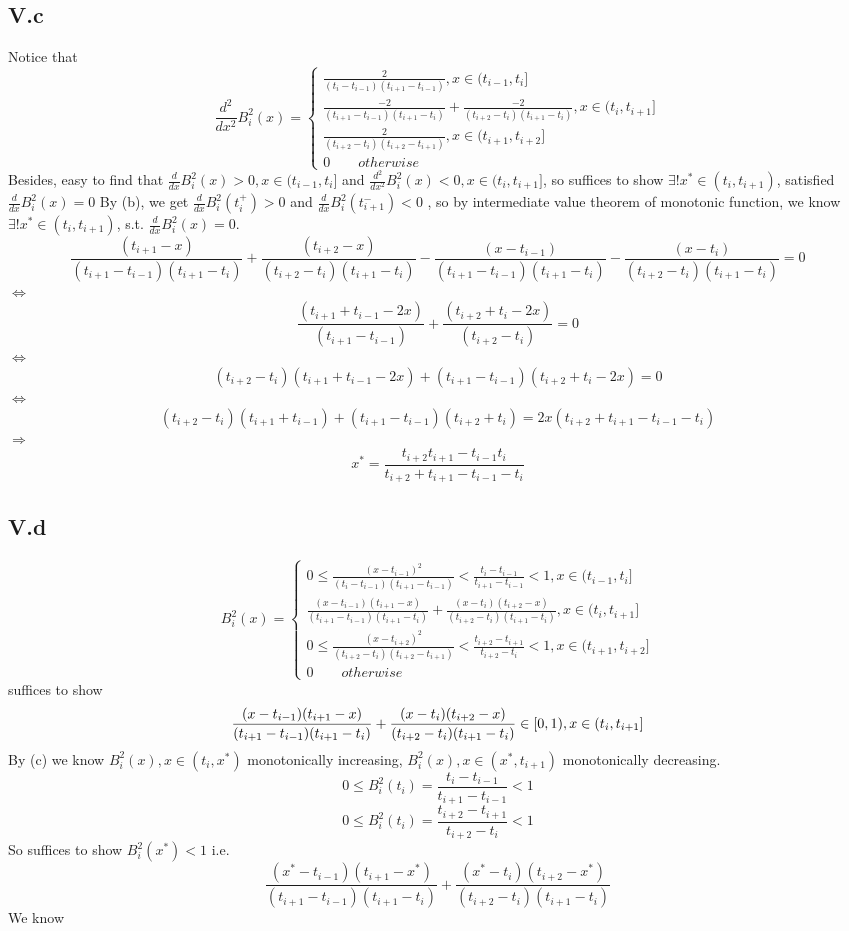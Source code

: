 \documentclass[a4paper]{article}
\begin{document}
\subsection*{V.c}
Notice that 
\[
\frac{d^2}{dx^2}B_i^2(x) = 
\begin{cases}
\frac{2}{(t_i-t_{i-1})(t_{i+1}-t_{i-1})}, x\in (t_{i-1},t_i] \\
\frac{-2}{(t_{i+1}-t_{i-1})(t_{i+1}-t_{i})}+
\frac{-2}{(t_{i+2}-t_{i})(t_{i+1}-t_{i})},x\in (t_{i},t_{i+1}] \\
\frac{2}{(t_{i+2}-t_{i})(t_{i+2}-t_{i+1})},x\in (t_{i+1},t_{i+2}] \\
0 \qquad otherwise
\end{cases}
\]
Besides, easy to find that $\frac{d}{dx}B_i^2(x) > 0, x\in (t_{i-1},t_i]$ and $\frac{d^2}{dx^2}B_i^2(x) < 0,x\in (t_{i},t_{i+1}]$, so suffices to show $\exists !x^* \in (t_{i},t_{i+1})$,
 satisfied  $\frac{d}{dx}B_i^2(x) = 0$ By (b), we get $\frac{d}{dx}B_i^2(t_i^+) > 0 $ and $\frac{d}{dx}B_i^2(t_{i+1}^-) < 0$
, so by intermediate value theorem of monotonic function, we know $\exists !x^* \in (t_{i},t_{i+1})$, s.t. 
$\frac{d}{dx}B_i^2(x) = 0$.
\[
\frac{(t_{i+1}-x)}{(t_{i+1}-t_{i-1})(t_{i+1}-t_{i})}+
\frac{(t_{i+2}-x)}{(t_{i+2}-t_{i})(t_{i+1}-t_{i})} - 
\frac{(x-t_{i-1})}{(t_{i+1}-t_{i-1})(t_{i+1}-t_{i})}-
\frac{(x-t_{i})}{(t_{i+2}-t_{i})(t_{i+1}-t_{i})} = 0 
\]
$\iff$
\[
\frac{(t_{i+1} +t_{i-1}-2x)}{(t_{i+1}-t_{i-1})}+
\frac{(t_{i+2}+t_i-2x)}{(t_{i+2}-t_{i})} = 0 
\]
$\iff$
\[
(t_{i+2}-t_{i})(t_{i+1} +t_{i-1}-2x)+
(t_{i+1}-t_{i-1})(t_{i+2}+t_i-2x) = 0 
\]
$\iff$
\[
(t_{i+2}-t_{i})(t_{i+1} +t_{i-1})+
(t_{i+1}-t_{i-1})(t_{i+2}+t_i) = 2x(t_{i+2}+t_{i+1}-t_{i-1}-t_{i}) 
\]
$\Rightarrow$
\[
x^* = \frac{t_{i+2}t_{i+1}-t_{i-1}t_{i}}{t_{i+2}+t_{i+1}-t_{i-1}-t_{i} }
\]
\subsection*{V.d}
\[
B_i^2(x) = 
\begin{cases}
0 \leqslant \frac{(x-t_{i-1})^2}{(t_i-t_{i-1})(t_{i+1}-t_{i-1})} < \frac{t_{i}-t_{i-1}}{t_{i+1}-t_{i-1}}<1, x\in (t_{i-1},t_i] \\
\frac{(x-t_{i-1})(t_{i+1}-x)}{(t_{i+1}-t_{i-1})(t_{i+1}-t_{i})}+\frac{(x-t_{i})(t_{i+2}-x)}{(t_{i+2}-t_{i})(t_{i+1}-t_{i})},x\in (t_{i},t_{i+1}] \\
0 \leqslant \frac{(x-t_{i+2})^2}{(t_{i+2}-t_{i})(t_{i+2}-t_{i+1})} < \frac{t_{i+2}-t_{i+1}}{t_{i+2}-t_{i}} < 1,x\in (t_{i+1},t_{i+2}] \\
0 \qquad otherwise
\end{cases}
\]
suffices to show
\[
\frac{(x-t_{i-1})(t_{i+1}-x)}{(t_{i+1}-t_{i-1})(t_{i+1}-t_{i})}+\frac{(x-t_{i})(t_{i+2}-x)}{(t_{i+2}-t_{i})(t_{i+1}-t_{i})}\in [0,1),x\in (t_{i},t_{i+1}] \\
\]
By (c) we know $B_i^2(x),x\in(t_i,x^*)$ monotonically increasing, $B_i^2(x),x\in(x^*,t_{i+1})$ monotonically decreasing. 
\[
0 \leqslant B_i^2(t_i) = \frac{t_{i}-t_{i-1}}{t_{i+1}-t_{i-1}}<1
\] 
\[
0 \leqslant B_i^2(t_i) =  \frac{t_{i+2}-t_{i+1}}{t_{i+2}-t_{i}} < 1
\] 
So suffices to show
$B_i^2(x^*) < 1$ i.e.
\[
\frac{(x^*-t_{i-1})(t_{i+1}-x^*)}{(t_{i+1}-t_{i-1})(t_{i+1}-t_{i})}+\frac{(x^*-t_{i})(t_{i+2}-x^*)}{(t_{i+2}-t_{i})(t_{i+1}-t_{i})}
\]
We know
\end{document}
